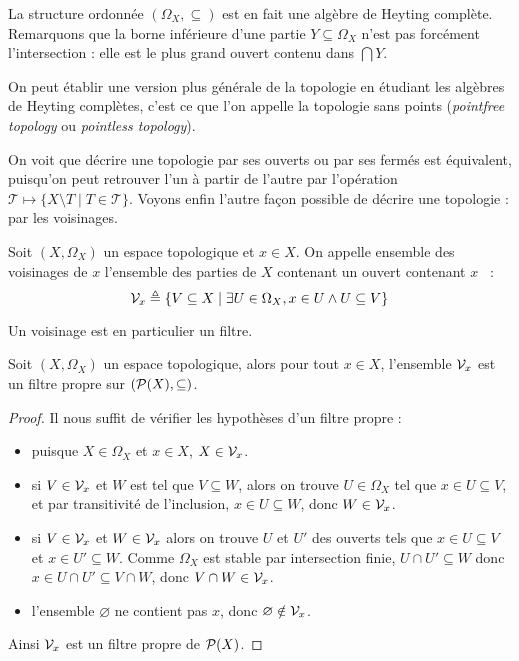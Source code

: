 \begin{remark}
  La structure ordonnée $(\Omega_X,\subseteq)$ est en fait une algèbre de
  Heyting complète. Remarquons que la borne inférieure d'une partie
  $Y\subseteq\Omega_X$ n'est pas forcément l'intersection : elle est le plus
  grand ouvert contenu dans $\bigcap Y$.

  On peut établir une version plus générale de la topologie en étudiant les
  algèbres de Heyting complètes, c'est ce que l'on appelle la topologie sans
  points (\textit{pointfree topology} ou \textit{pointless topology}).
\end{remark}

On voit que décrire une topologie par ses ouverts ou par ses fermés est
équivalent, puisqu'on peut retrouver l'un à partir de l'autre par l'opération
$\mathcal T \mapsto \{X\setminus T \mid T \in \mathcal T\}$. Voyons enfin
l'autre façon possible de décrire une topologie : par les voisinages.

\begin{definition}[Voisinage]
  Soit $(X,\Omega_X)$ un espace topologique et $x\in X$. On appelle ensemble des
  voisinages de $x$ l'ensemble des parties de $X$ contenant un ouvert contenant
  $x$~ :
  \[\mathcal{V}_x \triangleq \{V \subseteq X \mid \exists U \in \Omega_X, x\in U \land
  U\subseteq V\}\]
\end{definition}

Un voisinage est en particulier un filtre.

\begin{property}
  Soit $(X,\Omega_X)$ un espace topologique, alors pour tout $x\in X$,
  l'ensemble $\mathcal{V}_x$ est un filtre propre sur $(\mathcal{P}(X),\subseteq)$.
\end{property}

\begin{proof}
  Il nous suffit de vérifier les hypothèses d'un filtre propre :
  \begin{itemize}
  \item puisque $X\in\Omega_X$ et $x\in X$, $X\in \mathcal{V}_x$.
  \item si $V\in \mathcal{V}_x$ et $W$ est tel que $V\subseteq W$, alors on trouve
    $U\in \Omega_X$ tel que $x\in U \subseteq V$, et par transitivité de
    l'inclusion, $x\in U \subseteq W$, donc $W\in \mathcal{V}_x$.
  \item si $V\in \mathcal{V}_x$ et $W\in \mathcal{V}_x$ alors on trouve $U$ et $U'$ des
    ouverts tels que $x\in U \subseteq V$ et $x\in U' \subseteq W$. Comme
    $\Omega_X$ est stable par intersection finie, $U\cap U' \subseteq W$ donc
    $x\in U\cap U' \subseteq V\cap W$, donc $V\cap W \in \mathcal{V}_x$.
  \item l'ensemble $\varnothing$ ne contient pas $x$, donc
    $\varnothing\notin\mathcal{V}_x$.
  \end{itemize}

  Ainsi $\mathcal{V}_x$ est un filtre propre de $\mathcal{P}(X)$.
\end{proof}

